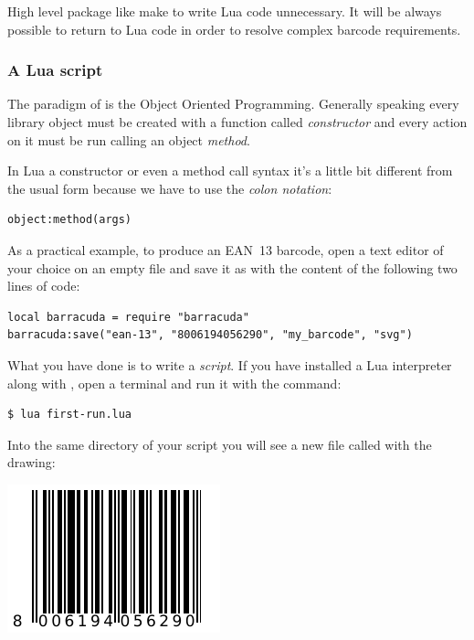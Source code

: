 \documentclass[11pt,a4paper]{article}
\begin{document}
High level package like  make to write Lua code unnecessary.
It will be always possible to return to Lua code in order to resolve complex
barcode requirements.


\subsubsection{A Lua script}

The paradigm of \brcd{} is the Object Oriented Programming. Generally speaking
every library object must be created with a function called \emph{constructor}
and every action on it must be run calling an object \emph{method}.

In Lua a constructor or even a method call syntax it's a little bit different
from the usual form because we have to use the \emph{colon notation}:
\begin{BVerbatim}
object:method(args)
\end{BVerbatim}

As a practical example, to produce an EAN~13 barcode, open a text editor of your
choice on an empty file and save it as  with the content of
the following two lines of code:
\begin{tcolorbox}[
    title={\code{first-run.lua}}
]
\begin{BVerbatim}
local barracuda = require "barracuda"
barracuda:save("ean-13", "8006194056290", "my_barcode", "svg")
\end{BVerbatim}
\end{tcolorbox}

What you have done is to write a \emph{script}. If you have installed a Lua
interpreter along with \brcd{}, open a terminal and run it with the command:
\begin{BVerbatim}
$ lua first-run.lua
\end{BVerbatim}

Into the same directory of your script you will see a new file called
 with the drawing:
\begin{center}
\includegraphics{image/8006194056290}
\end{center}
\end{document}
